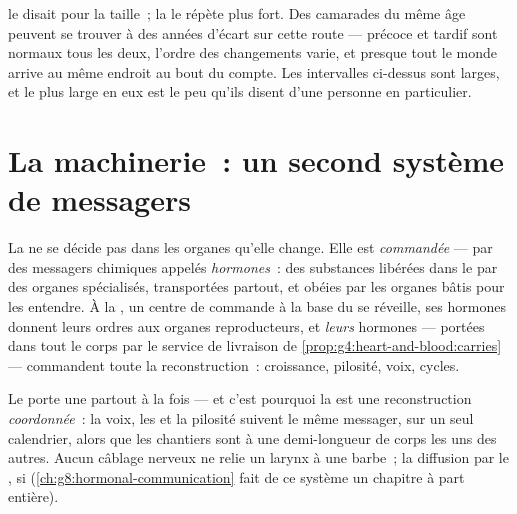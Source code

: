 \begin{remark}\label{rem:g8:puberty:timetable}
 le disait pour la taille~; la
 le répète plus fort. Des camarades du même âge peuvent se
trouver à des années d'écart sur cette route --- précoce et tardif
sont normaux tous les deux, l'ordre des changements varie, et
presque tout le monde arrive au même endroit au bout du compte. Les
intervalles ci-dessus sont larges, et le plus large en eux est le
peu qu'ils disent d'une personne en particulier.
\end{remark}

\section{La machinerie~: un second système de messagers}

\begin{definition}\label{def:g8:puberty:hormones}
La  ne se décide pas dans les organes qu'elle change. Elle
est \emph{commandée} --- par des messagers chimiques appelés
\emph{hormones}~: des substances libérées dans le
\emph{} par des organes spécialisés, transportées partout, et
obéies par les organes bâtis pour les entendre. À la , un
centre de commande à la base du  se réveille, ses hormones
donnent leurs ordres aux organes reproducteurs, et \emph{leurs}
hormones --- portées dans tout le corps par le service de livraison
de \cref{prop:g4:heart-and-blood:carries} --- commandent toute la
reconstruction~: croissance, pilosité, voix, cycles.
\end{definition}

\begin{example}\label{ex:g8:puberty:sites}
Le  porte une  partout à la fois --- et c'est pourquoi la
 est une reconstruction \emph{coordonnée}~: la voix, les
 et la pilosité suivent le même messager, sur un seul
calendrier, alors que les chantiers sont à une demi-longueur de
corps les uns des autres. Aucun câblage nerveux ne relie un larynx à
une barbe~; la diffusion par le , si
(\cref{ch:g8:hormonal-communication} fait de ce système un chapitre
à part entière).
\end{example}

